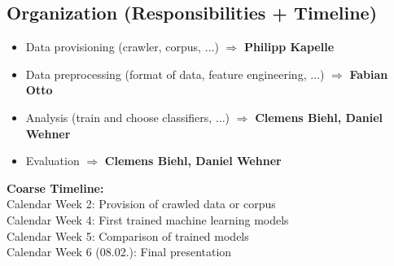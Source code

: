 \documentclass{scrartcl}
\begin{document}
\vspace*{-3mm}
\subsection{Organization (Responsibilities + Timeline)}
\vspace*{-3mm}

\begin{itemize}
\item Data provisioning (crawler, corpus,  $\dots$)
	$\Rightarrow$ \textbf{Philipp Kapelle}
\item Data preprocessing (format of data, feature engineering, $\dots$) 
	$\Rightarrow$ \textbf{Fabian Otto}
\item Analysis (train and choose classifiers, $\dots$)
	$\Rightarrow$ \textbf{Clemens Biehl, Daniel Wehner}
\item Evaluation
	$\Rightarrow$ \textbf{Clemens Biehl, Daniel Wehner}
\end{itemize}

\vspace*{-2mm}
\textbf{Coarse Timeline:} \\
Calendar Week 2: Provision of crawled data or corpus \\
Calendar Week 4: First trained machine learning models \\
Calendar Week 5: Comparison of trained models \\
Calendar Week 6 (08.02.): Final presentation
\end{document}
